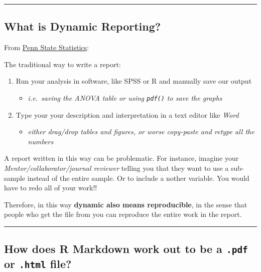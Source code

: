 \documentclass[]{book}
\providecommand{\tightlist}{%
  \setlength{\itemsep}{0pt}\setlength{\parskip}{0pt}}
\begin{document}
\begin{center}\rule{0.5\linewidth}{\linethickness}\end{center}

\subsection*{What is Dynamic
Reporting?}\label{what-is-dynamic-reporting}

From
\href{https://onlinecourses.science.psu.edu/statprogram/markdown}{Penn
State Statistics}:

The traditional way to write a report:

\begin{enumerate}
\def\labelenumi{\arabic{enumi}.}
\tightlist
\item
  Run your analysis in software, like SPSS or R and manually save our
  output

  \begin{itemize}
  \tightlist
  \item
    \emph{i.e.~saving the ANOVA table or using \texttt{pdf()} to save
    the graphs}
  \end{itemize}
\item
  Type your your description and interpretation in a text editor like
  \emph{Word}

  \begin{itemize}
  \tightlist
  \item
    \emph{either drag/drop tables and figures, or worse copy-paste and
    retype all the numbers}
  \end{itemize}
\end{enumerate}

A report written in this way can be problematic. For instance, imagine
your \emph{Mentor/collaborator/journal reviewer} telling you that they
want to use a sub-sample instead of the entire sample. Or to include a
nother variable. You would have to redo all of your work!!

Therefore, in this way \textbf{dynamic also means reproducible}, in the
sense that people who get the file from you can reproduce the entire
work in the report.

\begin{center}\rule{0.5\linewidth}{\linethickness}\end{center}

\subsection*{\texorpdfstring{How does R Markdown work out to be a
\texttt{.pdf} or \texttt{.html}
file?}{How does R Markdown work out to be a .pdf or .html file?}}\label{how-does-r-markdown-work-out-to-be-a-.pdf-or-.html-file}
\end{document}
